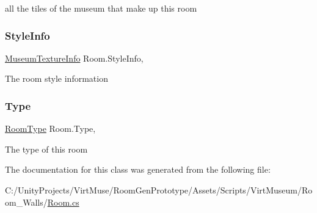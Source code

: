 all the tiles of the museum that make up this room 

\mbox{\label{class_room_a3cd7f8c4f2ee7b7397a40a463cd14196}} 
\subsubsection{\texorpdfstring{Style\+Info}{StyleInfo}}
{\footnotesize\ttfamily \mbox{\hyperlink{class_museum_texture_info}{Museum\+Texture\+Info}} Room.\+Style\+Info\hspace{0.3cm}{\ttfamily [get]}, {\ttfamily [set]}}



The room style information 

\mbox{\label{class_room_a55dc5c580ea31562a0aa6f11b4b8f462}} 
\subsubsection{\texorpdfstring{Type}{Type}}
{\footnotesize\ttfamily \mbox{\hyperlink{_room_8cs_ab540f7414f306325d92272bcef1e34e1}{Room\+Type}} Room.\+Type\hspace{0.3cm}{\ttfamily [get]}, {}}



The type of this room 



The documentation for this class was generated from the following file\+:\begin{DoxyCompactItemize}
\item 
C\+:/\+Unity\+Projects/\+Virt\+Muse/\+Room\+Gen\+Prototype/\+Assets/\+Scripts/\+Virt\+Museum/\+Room\+\_\+\+Walls/\mbox{\hyperlink{_room_8cs}{Room.\+cs}}\end{DoxyCompactItemize}
